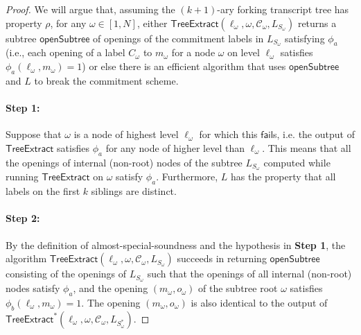 \begin{proof}
We will argue that, assuming the $(k+1)$-ary forking transcript tree has property $\rho$, for any $\omega \in [1,N]$, either $\textsf{TreeExtract}(\ell_\omega, \omega, \mathcal{C}_\omega, L_{S_\omega})$ returns a subtree $\textsf{openSubtree}$ of openings of the commitment labels in $L_{S_\omega}$ satisfying $\phi_a$ (i.e., each opening of a label $C_\omega$ to $m_\omega$ for a node $\omega$ on level $\ell_\omega$ satisfies $\phi_a(\ell_\omega, m_\omega) = 1$) or else there is an efficient algorithm that uses $\textsf{openSubtree}$ and $L$ to break the commitment scheme. 


\paragraph{Step 1:} Suppose that $\omega$ is a node of highest level $\ell_{\omega}$ for which this $\mathsf{fail}$s, i.e. the output of $\textsf{TreeExtract}$ satisfies $\phi_a$ for any node of higher level than $\ell_\omega$. 
This means that all the openings of internal (non-root) nodes of the subtree $L_{S_\omega}$ computed while running $\textsf{TreeExtract}$ on $\omega$ satisfy $\phi_a$. Furthermore, $L$ has the property that all labels on the first $k$ siblings are distinct. 

\paragraph{Step 2:} By the definition of almost-special-soundness and the hypothesis in \textbf{Step 1}, the algorithm $\textsf{TreeExtract}(\ell_\omega, \omega, \mathcal{C}_\omega, L_{S_\omega})$ succeeds in returning $\textsf{openSubtree}$ consisting of the openings of $L_{S_\omega}$ such that the openings of all internal (non-root) nodes satisfy $\phi_a$, and the opening $(m_\omega, o_\omega)$ of the subtree root $\omega$ satisfies $\phi_b(\ell_\omega, m_\omega) = 1$. The opening $(m_\omega, o_\omega)$ is also identical to the output of $\textsf{TreeExtract}^*(\ell_\omega, \omega, \mathcal{C}_\omega, L_{S^*_\omega})$. 


\end{proof}
